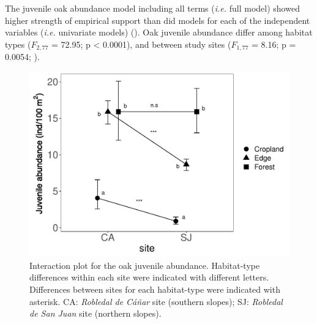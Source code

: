 The juvenile oak abundance model including all terms (\emph{i.e.} full model) showed higher strength of empirical support than did models for each of the independent variables (\emph{i.e.} univariate models) (). Oak juvenile abundance differ among habitat types (\(F_{2,77}\) = 72.95; p < 0.0001), and between study sites (\(F_{1,77}\) = 8.16; p = 0.0054; ). 

\begin{table}[]
\caption{Model selection for the oak juvenile abundance, sorted by minimum AICc value.}
%
\label{tab:coloniza:modelselection}
\end{table}

\begin{figure}
    \centering
    \includegraphics[width=\textwidth,height=8cm,
  keepaspectratio]{img/coloniza/coloniza-juvenile-interaction.pdf}
    \caption{Interaction plot for the oak juvenile abundance. Habitat-type differences within each site were indicated with different letters. Differences between sites for each habitat-type were indicated with asterisk. CA: \emph{Robledal de Cáñar} site (southern slopes); SJ: \emph{Robledal de San Juan} site (northern slopes).}
    \label{fig:coloniza:interaction}
\end{figure}

